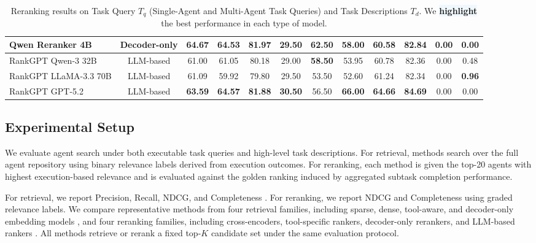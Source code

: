 \documentclass{article} %
\begin{document}
\begin{table}[!t]
{\begin{tabular}{lccccccccccc}
Qwen Reranker 4B & Decoder-only & \cellcolor{aliceblue}\textbf{64.67} & \cellcolor{aliceblue}\textbf{64.53} & \cellcolor{aliceblue}\textbf{81.97} & 29.50 & \cellcolor{aliceblue}\textbf{62.50} & \cellcolor{aliceblue}\textbf{58.00} & \cellcolor{aliceblue}\textbf{60.58} & \cellcolor{aliceblue}\textbf{82.84} & 0.00 & 0.00 \\
\hline
RankGPT Qwen-3 32B & LLM-based & 61.00 & 61.05 & 80.18 & 29.00 & \cellcolor{aliceblue}\textbf{58.50} & 53.95 & 60.78 & 82.36 & 0.00 & 0.48 \\
RankGPT LLaMA-3.3 70B & LLM-based & 61.09 & 59.92 & 79.80 & 29.50 & 53.50 & 52.60 & 61.24 & 82.34 & 0.00 & \cellcolor{aliceblue}\textbf{0.96} \\
RankGPT GPT-5.2 & LLM-based & \cellcolor{aliceblue}\textbf{63.59} & \cellcolor{aliceblue}\textbf{64.57} & \cellcolor{aliceblue}\textbf{81.88} & \cellcolor{aliceblue}\textbf{30.50} & 56.50 & \cellcolor{aliceblue}\textbf{66.00} & \cellcolor{aliceblue}\textbf{64.66} & \cellcolor{aliceblue}\textbf{84.69} & 0.00 & 0.00 \\
\bottomrule
\end{tabular}%
}
\caption{Reranking results on Task Query $T_q$ (Single-Agent and Multi-Agent Task Queries) and Task Descriptions $T_d$. We \colorbox{aliceblue}{\textbf{highlight}} the best performance in each type of model.}
\vspace{-0.5em}
\label{tab:rerank}
\end{table}






\subsection{Experimental Setup}

We evaluate agent search under both executable task queries and high-level task descriptions. For retrieval, methods search over the full agent repository using binary relevance labels derived from execution outcomes. For reranking, each method is given the top-20 agents with highest execution-based relevance and is evaluated against the golden ranking induced by aggregated subtask completion performance.

For retrieval, we report Precision, Recall, NDCG, and Completeness \citep{qu2024towards, shi2025retrieval}. For reranking, we report NDCG and Completeness using graded relevance labels. We compare representative methods from four retrieval families, including sparse, dense, tool-aware, and decoder-only embedding models \citep{robertson2009probabilistic, formal2021splade, santhanam2022colbertv2, izacard2021unsupervised, ni2022large, wang2021minilmv2, xiao2024cpack, shi2025retrieval, lu2025tools, qu2024towards}, and four reranking families, including cross-encoders, tool-specific rankers, decoder-only rerankers, and LLM-based rankers \citep{wang2021minilmv2, multi2024m3, li2025prorank, lu2025tools, nogueira2020document, qwen3embedding, sun2023chatgpt, ma2024fine}. All methods retrieve or rerank a fixed top-$K$ candidate set under the same evaluation protocol.
\end{document}
